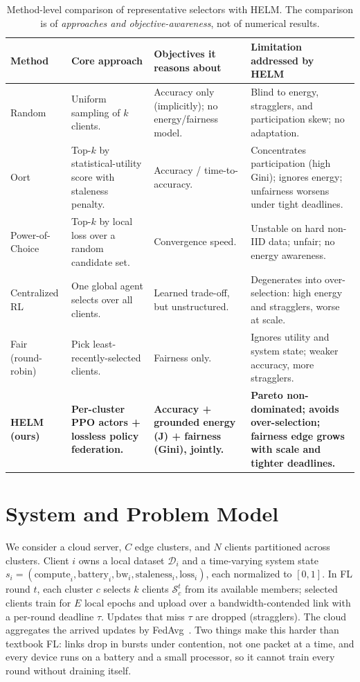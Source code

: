 \documentclass[conference]{IEEEtran}
\begin{document}
\begin{table}[t]
\caption{Method-level comparison of representative selectors with HELM. The
comparison is of \emph{approaches and objective-awareness}, not of numerical
results.}
\label{tab:methods}
\centering
\small
\begin{tabular}{p{2.1cm} p{4.6cm} p{4.2cm} p{4.6cm}}
\toprule
\textbf{Method} & \textbf{Core approach} & \textbf{Objectives it reasons about} &
\textbf{Limitation addressed by HELM} \\
\midrule
Random~\cite{mcmahan2017} & Uniform sampling of $k$ clients. & Accuracy only
(implicitly); no energy/fairness model. & Blind to energy, stragglers, and
participation skew; no adaptation. \\
Oort~\cite{oort} & Top-$k$ by statistical-utility score with staleness penalty. &
Accuracy / time-to-accuracy. & Concentrates participation (high Gini); ignores
energy; unfairness worsens under tight deadlines. \\
Power-of-Choice~\cite{poc} & Top-$k$ by local loss over a random candidate set. &
Convergence speed. & Unstable on hard non-IID data; unfair; no energy awareness.
\\
Centralized RL & One global agent selects over all clients. & Learned trade-off,
but unstructured. & Degenerates into over-selection: high energy and stragglers,
worse at scale. \\
Fair (round-robin) & Pick least-recently-selected clients. & Fairness only. &
Ignores utility and system state; weaker accuracy, more stragglers. \\
\textbf{HELM (ours)} & \textbf{Per-cluster PPO actors + lossless policy
federation.} & \textbf{Accuracy + grounded energy (J) + fairness (Gini), jointly.}
& \textbf{Pareto non-dominated; avoids over-selection; fairness edge grows with
scale and tighter deadlines.} \\
\bottomrule
\end{tabular}
\end{table}

\section{System and Problem Model}
\label{sec:model}
We consider a cloud server, $C$ edge clusters, and $N$ clients partitioned across
clusters. Client $i$ owns a local dataset $\mathcal{D}_i$ and a time-varying
system state
$s_i=(\text{compute}_i,\text{battery}_i,\text{bw}_i,\text{staleness}_i,
\text{loss}_i)$, each normalized to $[0,1]$. In FL round $t$, each cluster $c$
selects $k$ clients $\mathcal{S}_c^t$ from its available members; selected clients
train for $E$ local epochs and upload over a bandwidth-contended link with a
per-round deadline $\tau$. Updates that miss $\tau$ are dropped (stragglers). The
cloud aggregates the arrived updates by FedAvg~\cite{mcmahan2017}. Two things make
this harder than textbook FL: links drop in bursts under contention, not one
packet at a time, and every device runs on a battery and a small processor, so it
cannot train every round without draining itself.
\end{document}
